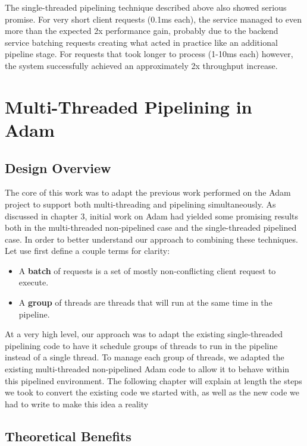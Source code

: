 \documentclass[11pt, oneside]{report}
\begin{document}
The single-threaded pipelining technique described above also showed serious promise. 
For very short client requests (0.1ms each), the service managed to even more than the expected 2x performance gain, probably due to the backend service batching requests creating what acted in practice like an additional pipeline stage. 
For requests that took longer to process (1-10ms each) however, the system successfully achieved an approximately 2x throughput increase.


\chapter{Multi-Threaded Pipelining in Adam}\label{AdamDesign}

\section{Design Overview}

The core of this work was to adapt the previous work performed on the Adam project to support both multi-threading and pipelining simultaneously. 
As discussed in chapter 3, initial work on Adam had yielded some promising results both in the multi-threaded non-pipelined case and the single-threaded pipelined case. 
In order to better understand our approach to combining these techniques. 
Let use first define a couple terms for clarity:
\begin{itemize}
\item A \textbf{batch} of requests is a set of mostly non-conflicting client request to execute.
\item A \textbf{group} of threads are threads that will run at the same time in the pipeline.
\end{itemize}

At a very high level, our approach was to adapt the existing single-threaded pipelining code to have it schedule groups of threads to run in the pipeline instead of a single thread. 
To manage each group of threads, we adapted the existing multi-threaded non-pipelined Adam code to allow it to behave within this pipelined environment. 
The following chapter will explain at length the steps we took to convert the existing code we started with, as well as the new code we had to write to make this idea a reality

\section{Theoretical Benefits}
\end{document}
